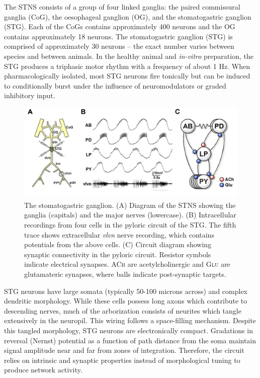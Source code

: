 The \acs{STNS} consists of a group of four linked ganglia: the paired commissural ganglia (\acs{CoG}), the oesophageal ganglion (\acs{OG}), and the stomatogastric ganglion (\acs{STG})\autocite{SelverstonCrustaceanStomatogastricSystem1987,Harris-WarrickDynamicBiologicalNetworks1992}. Each of the \acsp{CoG} contains approximately 400 neurons and the \acs{OG} contains approximately 18 neurons. The stomatogastric ganglion (\acs{STG}) is comprised of approximately 30 neurons – the exact number varies between species and between animals. In the healthy animal and \textit{in-vitro} preparation, the \acs{STG} produces a triphasic motor rhythm with a frequency of about 1 Hz\autocite{MarderCentralpatterngenerators2001,MarderRobustcircuitrhythms2015}. When pharmacologically isolated, most \acs{STG} neurons fire tonically but can be induced to conditionally burst  under the influence of neuromodulators or graded inhibitory input\autocite{MarderNeuromodulationNeuronalCircuits2012}.

\begin{figure}[h]
	\centering
	\includegraphics[width=1.0\linewidth]{gfx/PyloricRhythm}
	\caption[The stomatogastric ganglion]{The stomatogastric ganglion. (\textsc{A}) Diagram of the \acs{STNS} showing the ganglia (capitals) and the major nerves (lowercase). (\textsc{B}) Intracellular recordings from four cells in the pyloric circuit of the \acs{STG}. The fifth trace shows extracellular \textit{vlvn} nerve recording, which contains potentials from the above cells. (\textsc{C}) Circuit diagram showing synaptic connectivity in the pyloric circuit. Resistor symbols indicate electrical synapses. \textsc{ACh} are acetylcholinergic and \textsc{Glu} are glutamateric synapses, where balls indicate post-synaptic targets\autocite{NusbaumMichaelP.Functionalconsequencesneuropeptide2017}.}
	\label{fig:pyloricrhythm}
\end{figure}


\acs{STG} neurons have large somata (typically 50-100 microns across) and complex dendritic morphology\autocite{OtopalikSloppymorphologicaltuning2017,CuntzOnerulegrow2010}. While these cells possess long axons which contribute to descending nerves, much of the arborization consists of neurites which tangle extensively in the neuropil. This wiring follows a space-filling mechanism. Despite this tangled morphology, \acs{STG} neurons are electronically compact. Gradations in reversal (Nernst) potential as a function of path distance from the soma maintain signal amplitude near and far from zones of integration\autocite{OtopalikSloppymorphologicaltuning2017}. Therefore, the circuit relies on intrinsic and synaptic properties instead of morphological tuning to produce network activity.

